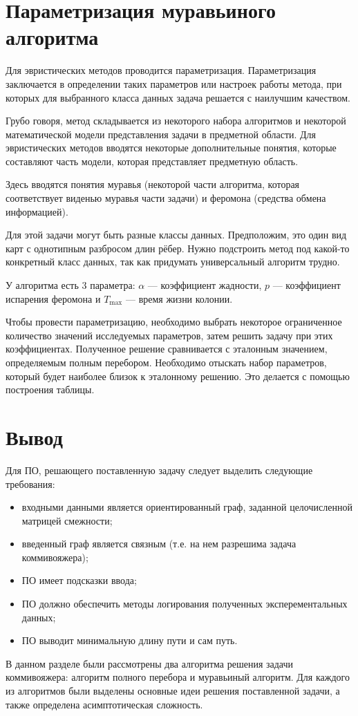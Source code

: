 \section{Параметризация муравьиного алгоритма}

Для эвристических методов проводится параметризация. Параметризация заключается в определении таких параметров или настроек работы метода, при которых для выбранного класса данных задача решается с наилучшим качеством.

Грубо говоря, метод складывается из некоторого набора алгорит­мов и некоторой математической модели представления задачи в предметной области. Для эвристических методов вводятся некоторые допол­нительные понятия, которые составляют часть модели, которая пред­ставляет предметную область.

Здесь вводятся понятия муравья (некоторой части алгорит­ма, которая соответствует виденью муравья части задачи) и феромо­на (средства обмена информацией).

Для этой задачи могут быть разные классы данных. Предполо­жим, это один вид карт с однотипным разбросом длин рёбер. Нужно подстроить метод под какой-то конкретный класс данных, так как приду­мать универсальный алгоритм трудно.

У алгоритма есть 3 параметра: $\alpha$ --- коэффициент жадности, $p$ --- коэффициент испарения феромона и $T_\text{max}$ --- время жизни колонии.

Чтобы провести параметризацию, необходимо выбрать некоторое ограни­ченное количество значений исследуемых параметров, затем решить задачу при этих коэффициентах. Полученное решение сравнивается с эталон­ным значением, определяемым полным перебором. Необходи­мо отыскать набор параметров, который будет наиболее близок к эталон­ному решению. Это делается с помощью построения таблицы.

\section{Вывод}

Для ПО, решающего поставленную задачу следует выделить следующие требования: 
\begin{itemize}
	\item входными данными является ориентированный граф, заданной целочисленной матрицей смежности;
	\item введенный граф является связным (т.е. на нем разрешима задача коммивояжера);
	\item ПО имеет подсказки ввода;
	\item ПО должно обеспечить методы логирования полученных эксперементальных данных;	
	\item ПО выводит минимальную длину пути и сам путь.
\end{itemize}

В данном разделе были рассмотрены два алгоритма решения задачи коммивояжера: алгоритм полного перебора и муравьиный алгоритм. Для каждого из алгоритмов были выделены основные идеи решения поставленной задачи, а также определена асимптотическая сложность.



